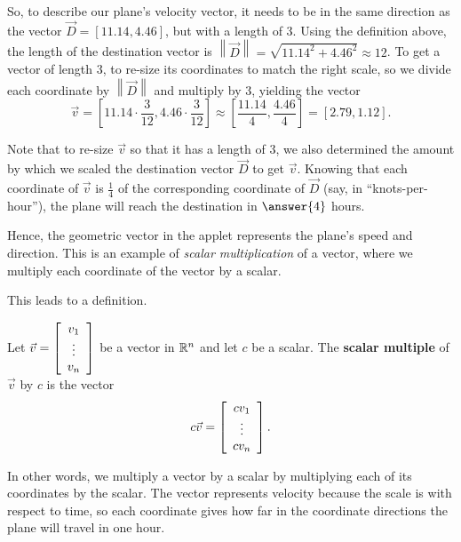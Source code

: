 \documentclass{ximera}
\begin{document}
\begin{example}
\begin{remark}
  \end{remark}

  So, to describe our plane's velocity vector, it needs to be in the same direction as the vector $\vec{D}=[11.14,4.46]$, but with a length of $3$. Using the definition above, the length of the destination vector is $\left\|\vec{D}\right\|=\sqrt{11.14^2+4.46^2}\approx 12$. To get a vector of length $3$, to re-size its coordinates to match the right scale, so we divide each coordinate by $\left\|\vec{D}\right\|$ and multiply by $3$, yielding the vector $$\vec{v}=\left[11.14\cdot \frac{3}{12},4.46\cdot \frac{3}{12}\right]\approx \left[\frac{11.14}{4},\frac{4.46}{4}\right] = [2.79,1.12].$$

  Note that to re-size $\vec{v}$ so that it has a length of $3$, we also determined the amount by which we scaled the destination vector $\vec{D}$ to get $\vec{v}$. Knowing that each coordinate of $\vec{v}$ is $\frac{1}{4}$ of the corresponding coordinate of $\vec{D}$ (say, in ``knots-per-hour''), the plane will reach the destination in $\answer{4}$ hours.

  Hence, the geometric vector in the applet represents the plane's speed and direction. This is an example of \emph{scalar multiplication} of a vector, where we multiply each coordinate of the vector by a scalar.

  \begin{remark}

    This leads to a definition.

    \begin{definition}

      Let $\vec{v} = \startmat{c} v_1 \\ \vdots \\ v_n \stopmat$ be a vector in $\R^n$ and let $c$ be a scalar. The \textbf{scalar multiple} of $\vec{v}$ by $c$ is the vector
      \begin{equation*}
        c\vec{v} = \startmat{c} cv_1 \\ \vdots \\ cv_n \stopmat.
      \end{equation*}

    \end{definition}

    In other words, we multiply a vector by a scalar by multiplying each of its coordinates by the scalar. The vector represents velocity because the scale is with respect to time, so each coordinate gives how far in the coordinate directions the plane will travel in one hour.

  \end{remark}

\end{example}
\end{document}
